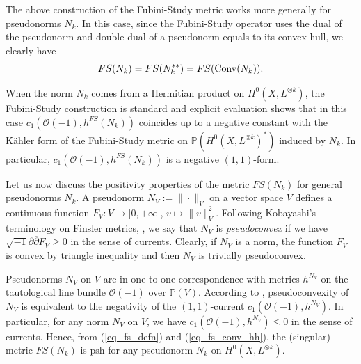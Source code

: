 \documentclass[12pt]{article}
\numberwithin{equation}{section}
\theoremstyle{theorem}
\theoremstyle{definition}
\theoremstyle{remark}
\newcommand{\imun} {\sqrt{-1}}
\newcommand{\Conv}[1]{{\rm{Conv}}{(#1)}}
\newcommand{\dbar}{ \overline{\partial} }
\begin{document}
	The above construction of the Fubini-Study metric works more generally for pseudonorms $N_k$.
	In this case, since the Fubini-Study operator uses the dual of the pseudonorm and double dual of a pseudonorm equals to its convex hull, we clearly have 
	\begin{equation}\label{eq_fs_conv_hh}
		FS(N_k) = FS(N_k^{**}) = FS(\Conv{N_k}).
	\end{equation}
	\par 
	When the norm $N_k$ comes from a Hermitian product on $H^0(X, L^{\otimes k})$, the Fubini-Study construction is standard and explicit evaluation shows that in this case $c_1(\mathscr{O}(-1) , h^{FS}(N_k))$ coincides up to a negative constant with the Kähler form of the Fubini-Study metric on $\mathbb{P}(H^0(X, L^{\otimes k})^*)$ induced by $N_k$.
	In particular, $c_1(\mathscr{O}(-1) , h^{FS}(N_k))$ is a negative $(1, 1)$-form.
	\par 
	Let us now discuss the positivity properties of the metric $FS(N_k)$ for general pseudonorms $N_k$.
	A pseudonorm $N_V := \| \cdot \|_V$ on a vector space $V$ defines a continuous function $F_V : V \to [0, +\infty[$, $v \mapsto \| v \|_V^2$.
	Following Kobayashi's terminology on Finsler metrics, \cite{KobFinNeg}, we say that $N_V$ is \textit{pseudoconvex} if we have $\imun \partial \dbar F_V \geq 0$ in the sense of currents.
	Clearly, if $N_V$ is a norm, the function $F_V$ is convex by triangle inequality and then $N_V$ is trivially pseudoconvex.
	\par 
	Pseudonorms $N_V$ on $V$ are in one-to-one correspondence with metrics $h^{N_V}$ on the tautological line bundle $\mathscr{O}(-1)$ over $\mathbb{P}(V)$.
	According to {\cite[Theorem 4.1]{KobFinNeg}}, pseudoconvexity of $N_V$ is equivalent to the negativity of the $(1, 1)$-current $c_1(\mathscr{O}(-1), h^{N_V})$.
	In particular, for any norm $N_V$ on $V$, we have $c_1(\mathscr{O}(-1), h^{N_V}) \leq 0$ in the sense of currents.
	Hence, from (\ref{eq_fs_defn}) and (\ref{eq_fs_conv_hh}), the (singular) metric $FS(N_k)$ is psh for any pseudonorm $N_k$ on $H^0(X, L^{\otimes k})$.
	
	
\end{document}
